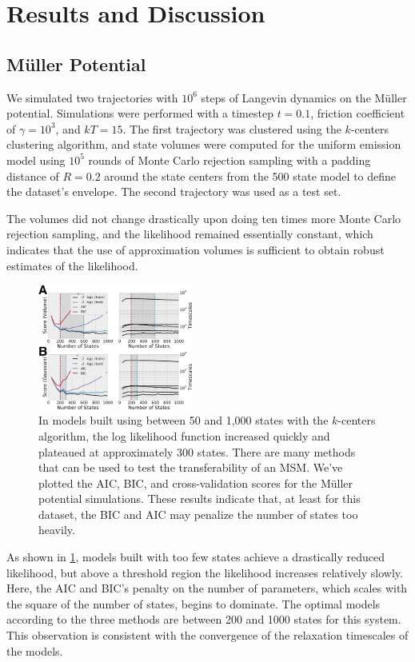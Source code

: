 \documentclass[twocolumn,floatfix,nofootinbib,aps]{revtex4-1}
\begin{document}
\section{Results and Discussion}
\subsection{M\"{u}ller Potential}
We simulated two trajectories with $10^6$ steps of Langevin dynamics on the M\"{u}ller potential\cite{}. Simulations were performed with a timestep $t=0.1$, friction coefficient of $\gamma=10^3$, and $kT=15$. The first trajectory was clustered using the $k$-centers clustering algorithm, and state volumes were computed for the uniform emission model using $10^5$ rounds of Monte Carlo rejection sampling with a padding distance of $R=0.2$ around the state centers from the 500 state model to define the dataset's envelope. The second trajectory was used as a test set.

The volumes did not change drastically upon doing ten times more Monte Carlo rejection sampling, and the likelihood remained essentially constant, which indicates that the use of approximation volumes is sufficient to obtain robust estimates of the likelihood. 

\begin{figure}[h]
\centering
\includegraphics[width=2in]{figs_final/mull_likes.png}
\caption{In models built using between 50 and 1,000 states with the $k$-centers algorithm, the log likelihood function increased quickly and plateaued at approximately 300 states. There are many methods that can be used to test the transferability of an MSM. We've plotted the AIC, BIC, and cross-validation scores for the M\"uller potential simulations. These results indicate that, at least for this dataset, the BIC and AIC may penalize the number of states too heavily.}
\label{fig:mullerlike}
\end{figure}

As shown in \cref{fig:mullerlike}, models built with too few states achieve a drastically reduced likelihood, but above a threshold region the likelihood increases relatively slowly. Here, the AIC and BIC's penalty on the number of parameters, which scales with the square of the number of states, begins to dominate. The optimal models according to the three methods are between 200 and 1000 states for this system. This observation is consistent with the convergence of the relaxation timescales of the models.
\end{document}

